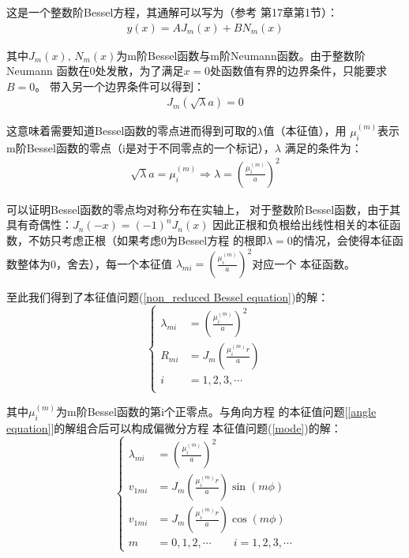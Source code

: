 \documentclass[a4paper]{ctexart}
\begin{document}
	\par 
	这是一个整数阶Bessel方程，其通解可以写为（参考\cite{mathematicalmethod}
	第17章第1节）：
	\begin{align}
		y(x) = AJ_{m}(x) + BN_{m}(x)
	\end{align}
	\par 其中$J_{m}(x),\,N_{m}(x)$为m阶Bessel函数与m阶Neumann函数。由于整数阶Neumann
	函数在0处发散，为了满足$x=0$处函数值有界的边界条件，只能要求$B=0$。
	带入另一个边界条件可以得到：
	\begin{align}
		J_{m}(\sqrt{\lambda}a) = 0
	\end{align}
	\par 这意味着需要知道Bessel函数的零点进而得到可取的$\lambda$值（本征值），用
	$\mu_{i}^{(m)}$表示m阶Bessel函数的零点（i是对于不同零点的一个标记），$\lambda$
	满足的条件为：
	\begin{align}
		\sqrt{\lambda} a = \mu_{i}^{(m)}
		\Rightarrow \lambda = \left(\frac{\mu_{i}^{(m)}}{a}\right)^2 
	\end{align}
	\par 可以证明Bessel函数的零点均对称分布在实轴上\cite{specialfunction}，
	对于整数阶Bessel函数，由于其具有奇偶性\cite{mathematicalmethod}：$J_n(-x) = (-1)^n J_n(x)$
	因此正根和负根给出线性相关的本征函数，不妨只考虑正根（如果考虑0为Bessel方程
	的根即$\lambda = 0$的情况，会使得本征函数整体为0，舍去），每一个本征值
	$\lambda_{mi} = \left(\frac{\mu_{i}^{(m)}}{a}\right)^2$对应一个
	本征函数。
	\par
	至此我们得到了本征值问题(\ref{non_reduced Bessel equation})的解：
	\begin{equation}
		\left\{ 
		\begin{split}
			\lambda_{mi} &= \left(\frac{\mu_{i}^{(m)}}{a}\right)^2\\
			R_{mi} &= J_{m}\left(\frac{\mu_{i}^{(m)}r}{a}\right)\\
			i &= 1, 2, 3,\cdots\\
		\end{split}
		\right.
	\end{equation}
	\par  其中$\mu_{i}^{(m)}$为m阶Bessel函数的第i个正零点。与角向方程
	的本征值问题[\ref{angle equation}]的解组合后可以构成偏微分方程
	本征值问题(\ref{mode})的解：
	\begin{equation}
		\left\{
		\begin{split}
			\lambda_{mi} &= \left(\frac{\mu_{i}^{(m)}}{a}\right)^2\\
			v_{1mi} &= J_m\left(\frac{\mu_{i}^{(m)}r}{a}\right)\sin(m\phi)\\
			v_{1mi} &= J_m\left(\frac{\mu_{i}^{(m)}r}{a}\right)\cos(m\phi)\\
			m &= 0,1,2,\cdots\quad \quad i = 1, 2, 3,\cdots
		\end{split}
		\right.
	\end{equation}
\end{document}
